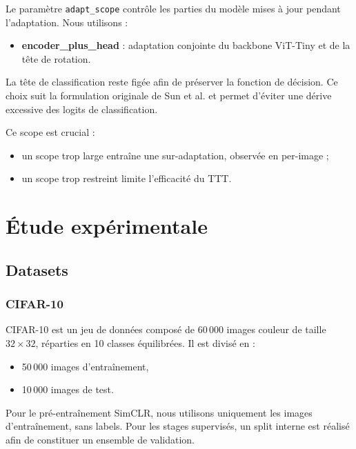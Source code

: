 \documentclass[12pt,a4paper]{report}
\begin{document}
	Le paramètre \texttt{adapt\_scope} contrôle les parties du modèle mises à jour pendant l’adaptation.  
	Nous utilisons :
	\begin{itemize}
		\item \textbf{encoder\_plus\_head} : adaptation conjointe du backbone ViT-Tiny et de la tête de rotation.
	\end{itemize}
	
	La tête de classification reste figée afin de préserver la fonction de décision.  
	Ce choix suit la formulation originale de Sun et al. et permet d’éviter une dérive excessive des logits de classification.
	
	Ce scope est crucial :  
	\begin{itemize}
		\item un scope trop large entraîne une sur-adaptation, observée en per-image ;
		\item un scope trop restreint limite l’efficacité du TTT.
	\end{itemize}

	\chapter{Étude expérimentale}
	
	\section{Datasets}
	
	\subsection{CIFAR-10}
	CIFAR-10 est un jeu de données composé de 60\,000 images couleur de taille $32 \times 32$, réparties en 10 classes équilibrées. Il est divisé en :
	\begin{itemize}
		\item 50\,000 images d’entraînement,
		\item 10\,000 images de test.
	\end{itemize}
	
	Pour le pré-entraînement SimCLR, nous utilisons uniquement les images d’entraînement, sans labels. Pour les stages supervisés, un split interne est réalisé afin de constituer un ensemble de validation.
	
\end{document}
